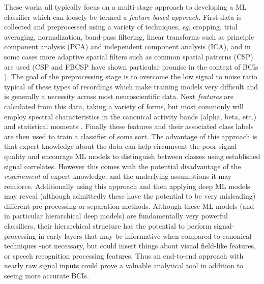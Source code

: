 \documentclass[utf8]{frontiersSCNS} %
\begin{document}

These works all typically focus on a multi-stage approach to developing a ML classifier which can loosely be termed a \emph{feature based approach}. First data is collected and preprocessed using a variety of techniques, \emph{eg.} cropping, trial averaging, normalization, band-pass filtering, linear transforms such as principle component analysis (PCA) and independent component analysis (ICA), and in some cases more adaptive spatial filters such as common spatial patterns (CSP) are used (CSP and FBCSP have shown particular promise in the context of BCIs \cite{Tangermann2012}). The goal of the preprocessing stage is to overcome the low signal to noise ratio typical of these types of recordings which make training models very difficult and is generally a necessity across most neuroscientific data. Next \emph{features} are calculated from this data, taking a variety of forms, but most commonly will employ spectral characteristics in the canonical activity bands (alpha, beta, etc.)\cite{} and statistical moments \cite{}. Finally these features and their associated class labels are then used to train a classifier of some sort. The advantage of this approach is that expert knowledge about the data can help circumvent the poor signal quality and encourage ML models to distinguish between classes using established signal correlates. However this comes with the potential disadvantage of the {\em requirement} of expert knowledge, and the underlying assumptions it may reinforce. Additionally using this approach and then applying deep ML models may reveal (although admittedly these have the potential to be very misleading) different pre-processing or separation methods. Although these ML models (and in particular hierarchical deep models) are fundamentally very powerful classifiers, their hierarchical structure has the potential to perform signal-processing in early layers that may be informative when compared to canonical techniques -not necessary, but could insert things about visual field-like features, or speech recognition processing features. Thus an end-to-end approach with nearly raw signal inputs could prove a valuable analytical tool in addition to seeing more accurate BCIs.

\end{document}
